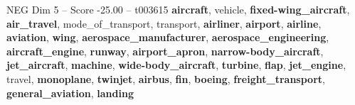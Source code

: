 \begin{textsample}{NEG Dim 5 – Score -25.00 – t003615}  \label{ex:f5_neg_002}
\textbf{aircraft}, vehicle, \textbf{fixed-wing\_aircraft}, \textbf{air\_travel}, mode\_of\_transport, transport, \textbf{airliner}, \textbf{airport}, \textbf{airline}, \textbf{aviation}, \textbf{wing}, \textbf{aerospace\_manufacturer}, \textbf{aerospace\_engineering}, \textbf{aircraft\_engine}, \textbf{runway}, \textbf{airport\_apron}, \textbf{narrow-body\_aircraft}, \textbf{jet\_aircraft}, \textbf{machine}, \textbf{wide-body\_aircraft}, \textbf{turbine}, \textbf{flap}, \textbf{jet\_engine}, travel, \textbf{monoplane}, \textbf{twinjet}, \textbf{airbus}, \textbf{fin}, \textbf{boeing}, \textbf{freight\_transport}, \textbf{general\_aviation}, \textbf{landing}

\end{textsample}
